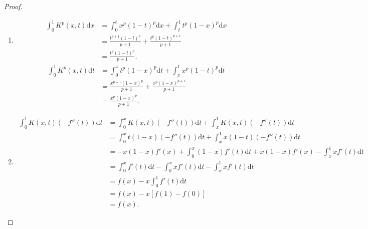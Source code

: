 \documentclass[../../main.tex]{subfiles}
\begin{document}
\begin{proof}
\begin{enumerate}[(1)]
\item \begin{align*}
\int_0^1{K^p\left( x,t \right) \mathrm{d}x}&=\int_0^t{x^p\left( 1-t \right) ^p\mathrm{d}x}+\int_t^1{t^p\left( 1-x \right) ^p\mathrm{d}x}
\\
&=\frac{t^{p+1}\left( 1-t \right) ^p}{p+1}+\frac{t^p\left( 1-t \right) ^{p+1}}{p+1}
\\
&=\frac{t^p\left( 1-t \right) ^p}{p+1}.
\end{align*}
\begin{align*}
\int_0^1{K^p\left( x,t \right) \mathrm{d}t}&=\int_0^x{t^p\left( 1-x \right) ^p\mathrm{d}t}+\int_x^1{x^p\left( 1-t \right) ^p\mathrm{d}t}
\\
&=\frac{x^{p+1}\left( 1-x \right) ^p}{p+1}+\frac{x^p\left( 1-x \right) ^{p+1}}{p+1}
\\
&=\frac{x^p\left( 1-x \right) ^p}{p+1}.
\end{align*}

\item \begin{align*}
\int_0^1{K\left( x,t \right) \left( -f'' \left( t \right) \right) \mathrm{d}t}&=\int_0^x{K\left( x,t \right) \left( -f'' \left( t \right) \right) \mathrm{d}t}+\int_x^1{K\left( x,t \right) \left( -f'' \left( t \right) \right) \mathrm{d}t}
\\
&=\int_0^x{t\left( 1-x \right) \left( -f'' \left( t \right) \right) \mathrm{d}t}+\int_x^1{x\left( 1-t \right) \left( -f'' \left( t \right) \right) \mathrm{d}t}
\\
&=-x\left( 1-x \right) f' \left( x \right) +\int_0^x{\left( 1-x \right) f' \left( t \right) \mathrm{d}t}+x\left( 1-x \right) f' \left( x \right) -\int_x^1{xf' \left( t \right) \mathrm{d}t}
\\
&=\int_0^x{f' \left( t \right) \mathrm{d}t}-\int_0^x{xf' \left( t \right) \mathrm{d}t}-\int_x^1{xf' \left( t \right) \mathrm{d}t}
\\
&=f\left( x \right) -x\int_0^1{f' \left( t \right) \mathrm{d}t}
\\
&=f\left( x \right) -x\left[ f\left( 1 \right) -f\left( 0 \right) \right] 
\\
&=f\left( x \right) .
\end{align*}
\end{enumerate}

\end{proof}
\end{document}
